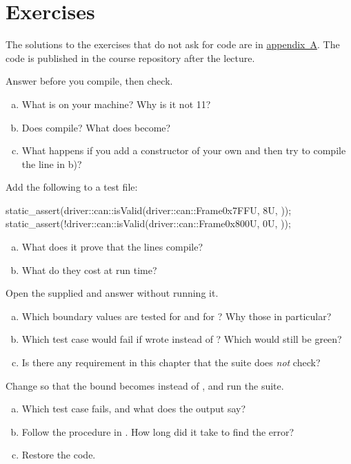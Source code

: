 \section*{Exercises}

The solutions to the exercises that do not ask for code are in
\hyperref[ch:losningar]{appendix~A}. The code is published in the course repository after the
lecture.

\label{ex:5:1}
Answer before you compile, then check.
\begin{enumerate}[a)]
  \item What is  on your machine? Why is it not 11?
  \item Does  compile? What does
     become?
  \item What happens if you add a constructor of your own and then try to compile the line in b)?
\end{enumerate}

\label{ex:5:2}
Add the following to a test file:
\begin{cppcode}
static_assert(driver::can::isValid(driver::can::Frame{0x7FFU, 8U, {}}));
static_assert(!driver::can::isValid(driver::can::Frame{0x800U, 0U, {}}));
\end{cppcode}
\begin{enumerate}[a)]
  \item What does it prove that the lines compile?
  \item What do they cost at run time?
\end{enumerate}

\label{ex:5:3}
Open the supplied  and answer without running it.
\begin{enumerate}[a)]
  \item Which boundary values are tested for  and for ? Why those in
    particular?
  \item Which test case would fail if  wrote \code{<} instead of \code{<=}? Which
    would still be green?
  \item Is there any requirement in this chapter that the suite does \emph{not} check?
\end{enumerate}

\label{ex:5:4}
Change  so that the  bound becomes \code{<} instead of \code{<=}, and run
the suite.
\begin{enumerate}[a)]
  \item Which test case fails, and what does the output say?
  \item Follow the procedure in . How long did it take to find the error?
  \item Restore the code.
\end{enumerate}

